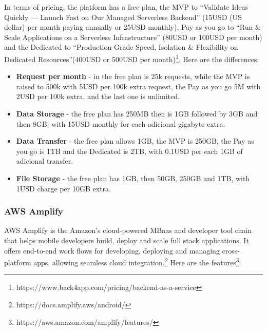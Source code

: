 In terms of pricing, the platform has a free plan, the MVP to ``Validate Ideas Quickly — Launch Fast on Our Managed Serverless Backend'' (15USD (US dollar) per month paying annually or 25USD monthly), Pay as you go to ``Run \& Scale Applications on a Serverless Infrastructure'' (80USD or 100USD per month) and the Dedicated to ``Production-Grade Speed, Isolation \& Flexibility on Dedicated Resources''(400USD or 500USD per month)\footnote{https://www.back4app.com/pricing/backend-as-a-service}. Here are the differences:

\begin{itemize}
	\item \textbf{Request per month} - in the free plan is 25k requests, while the MVP is raised to 500k with 5USD per 100k extra request, the Pay as you go 5M with 2USD per 100k extra, and the last one is unlimited.
	\item \textbf{Data Storage }- the free plan has 250MB then is 1GB followed by 3GB and then 8GB, with 15USD monthly for each adicional gigabyte extra.
	\item \textbf{Data Transfer} - the free plan allows 1GB, the MVP is 250GB, the Pay as you go is 1TB and the Dedicated is 2TB, with 0.1USD per each 1GB of adicional transfer.
	\item \textbf{File Storage} - the free plan has 1GB, then 50GB, 250GB and 1TB, with 1USD charge per 10GB extra.
\end{itemize}

\subsubsection{\textbf{AWS Amplify}}

AWS Amplify is the Amazon's cloud-powered MBaas and developer tool chain that helps mobile developers build, deploy and scale full stack applications. It offers end-to-end work flows for developing, deploying and managing cross-platform apps, allowing seamless cloud integration.\footnote{https://docs.amplify.aws/android/} Here are the features\footnote{https://aws.amazon.com/amplify/features/}:

